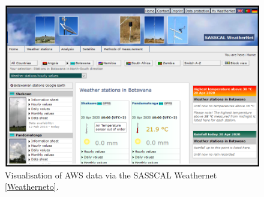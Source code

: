 \documentclass[a4paper, 10pt, conference]{ieeeconf}      %
\begin{document}
\begin{figure}[tbh!]
\centering
\includegraphics[width=1\columnwidth]{fig/SasscalWeathernet.png}
\caption{Visualisation of   AWS   data via the SASSCAL Weathernet  \ref{Weatherneto}.}
\label{SASSCA}
\end{figure}
\end{document}
